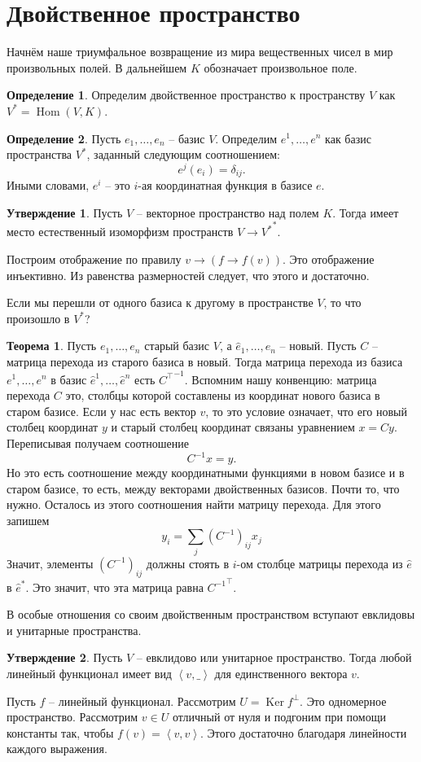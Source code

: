 \documentclass[10pt,a4paper,oneside]{book}
\theoremstyle{definition}
\newtheorem*{defn}{\color{yellow!30!red} Определение}
\newtheorem{thm}{\color{red!40!black}Теорема}
\newtheorem{utvr}{\color{blue!50!black}Утверждение}
\DeclareMathOperator{\Ker}{Ker}
\newcommand{\Hom}{\operatorname{Hom}}
\def\lan{\left\langle }
\def\ran{\right\rangle}
\def\thrm{\begin{thm}}
\def\ethrm{\end{thm}}
\def\dfn{\begin{defn}}
\def\edfn{\end{defn}}
\def\utv{\begin{utvr}}
\def\eutv{\end{utvr}}
\begin{document}
\section{Двойственное пространство}

Начнём наше триумфальное возвращение из мира вещественных чисел в мир произвольных полей. В дальнейшем $K$ обозначает произвольное поле. 

\dfn Определим двойственное пространство к пространству $V$ как $V^*=\Hom (V, K)$.
\edfn

\dfn Пусть $e_1,\dots,e_n$ -- базис $V$. Определим $e^1,\dots,e^n$ как базис пространства $V^*$, заданный следующим соотношением: 
$$e^j(e_i)=\delta_{ij}.$$
Иными словами, $e^i$ -- это $i$-ая координатная функция в базисе $e$.
\edfn

\utv Пусть $V$ -- векторное пространство над полем $K$. Тогда имеет место естественный изоморфизм пространств $V\to {V^*}^*$.
\eutv
\proof Построим отображение по правилу $v \to (f \to f(v))$. Это отображение инъективно. Из равенства размерностей следует, что этого и достаточно.
\endproof

Если мы перешли от одного базиса к другому в пространстве $V$, то что произошло в $V^*$? 

\thrm Пусть $e_1,\dots,e_n$ старый базис $V$, а $\hat{e}_1,\dots,\hat{e}_n$ -- новый. Пусть $C$ -- матрица перехода из старого базиса в новый. Тогда матрица перехода из базиса $e^1,\dots,e^n$ в базис $\hat{e}^1,\dots,\hat{e}^n$ есть ${C^{\top}}^{-1}$.
\proof Вспомним нашу конвенцию: матрица перехода $C$ это, столбцы которой составлены из координат нового базиса в старом базисе. Если у нас есть вектор $v$, то это условие означает, что его новый столбец координат $y$ и старый столбец координат связаны уравнением $x=Cy$. Переписывая получаем соотношение 
$$C^{-1}x=y.$$
Но это есть соотношение между координатными функциями в новом базисе и в старом базисе, то есть, между векторами двойственных базисов. Почти то, что нужно. Осталось из этого соотношения найти матрицу перехода. Для этого запишем $$y_i=\sum_j (C^{-1})_{ij}x_j$$
Значит, элементы $(C^{-1})_{ij}$ должны стоять в $i$-ом столбце матрицы перехода из $\hat{e}$ в $\hat{e}^*$. Это значит, что эта матрица равна ${C^{-1}}^{\top}$.
\endproof
\ethrm

В особые отношения со своим двойственным пространством вступают евклидовы и унитарные пространства. 

\utv Пусть $V$ -- евклидово или унитарное пространство. Тогда любой линейный функционал имеет вид $\lan v, \_ \ran$ для единственного вектора $v$. 
\eutv
\proof Пусть $f$ -- линейный функционал. Рассмотрим $U=\Ker f^\bot$. Это одномерное пространство. Рассмотрим $v\in U$ отличный от нуля и подгоним при помощи константы так, чтобы  $f(v)=\lan v,v \ran$. Этого достаточно благодаря линейности каждого выражения.  
\endproof
\end{document}

